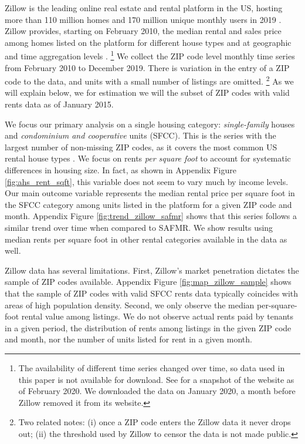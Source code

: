 Zillow is the leading online real estate and rental platform in the US, hosting
more than 110 million homes and 170 million unique monthly users in 2019 
\parencite{ZillowFacts}.
Zillow provides, starting on February 2010, the median rental and sales price 
among homes listed on the platform for different house types and at geographic
and time aggregation levels \parencite{ZillowData}.%
\footnote{The availability of different time series changed over time, so
data used in this paper is not available for download.
See \textcite{ZillowDataArchive} for a snapshot of the website as of 
February 2020.
We downloaded the data on January 2020, a month before Zillow removed it from
its website.} 
We collect the ZIP code level monthly time series from February 2010 to 
December 2019. 
There is variation in the entry of a ZIP code to the data, and units with a small 
number of listings are omitted.%
\footnote{Two related notes:
(i) once a ZIP code enters the Zillow data it never drops out;
(ii) the threshold used by Zillow to censor the data is not made public.}
As we will explain below, we for estimation we will the subset of ZIP codes
with valid rents data as of January 2015.

We focus our primary analysis on a single housing category:
\textit{single-family} houses and \textit{condominium and cooperative} units (SFCC).
This is the series with the largest number of non-missing ZIP codes, as it 
covers the most common US rental house types \parencite{Fernald2020}.
We focus on rents \textit{per square foot} to account for systematic differences
in housing size.
In fact, as shown in Appendix Figure \ref{fig:ahs_rent_sqft}, this variable does 
not seem to vary much by income levels.
Our main outcome variable represents the median rental price per square foot in 
the SFCC category among units listed in the platform for a given ZIP code and 
month.
Appendix Figure \ref{fig:trend_zillow_safmr} shows that this series follows a 
similar trend over time when compared to SAFMR.
We show results using median rents per square foot in other rental categories 
available in the data as well.

Zillow data has several limitations.
First, Zillow's market penetration dictates the sample of ZIP codes available.
Appendix Figure \ref{fig:map_zillow_sample} shows that the sample of ZIP codes
with valid SFCC rents data typically coincides with areas of high population 
density.
Second, we only observe the median per-square-foot rental value among listings.
We do not observe actual rents paid by tenants in a given period, 
the distribution of rents among listings in the given ZIP code and month, nor
the number of units listed for rent in a given month.

